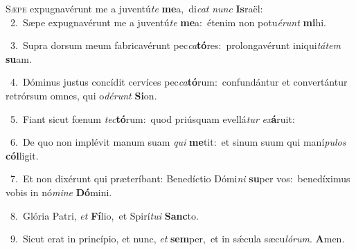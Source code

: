 \lettrine{\initial\textcolor{\initialcolor}{S}}{æpe} expugnavérunt me a juventú\textit{te} \textbf{me}\-a,~\star di\textit{cat} \textit{nunc} \textbf{Is}\-raël:\\
{\numbfont\textcolor{\numbcolor}{~2.}}~Sæpe expugnavérunt me a juventú\textit{te} \textbf{me}\-a:~\star étenim non potu\-\textit{é}\-\textit{runt} \textbf{mi}\-hi.\par
{\numbfont\textcolor{\numbcolor}{~3.}}~Supra dorsum meum fabricavérunt pec\-\textit{ca}\-\textbf{tó}res:~\star prolongavérunt iniqui\-\textit{tá}\-\textit{tem} \textbf{su}\-am.\par
{\numbfont\textcolor{\numbcolor}{~4.}}~Dóminus justus concídit cervíces pec\-\textit{ca}\-\textbf{tó}rum:~\star confundántur et convertántur retrórsum omnes, qui o\-\textit{dé}\-\textit{runt} \textbf{Si}\-on.\par
{\numbfont\textcolor{\numbcolor}{~5.}}~Fiant sicut fœnum \textit{tec}\-\textbf{tó}rum:~\star quod priúsquam evellá\textit{tur} \textit{ex}\-\textbf{á}ruit:\par
{\numbfont\textcolor{\numbcolor}{~6.}}~De quo non implévit manum suam \textit{qui} \textbf{me}\-tit:~\star et sinum suum qui maní\-\textit{pu}\-\textit{los} \textbf{cól}\-ligit.\par
{\numbfont\textcolor{\numbcolor}{~7.}}~Et non dixérunt qui præteríbant: Benedíctio Dómi\textit{ni} \textbf{su}\-per vos:~\star benedíximus vobis in nó\-\textit{mi}\-\textit{ne} \textbf{Dó}\-mini.\par
{\numbfont\textcolor{\numbcolor}{~8.}}~Glória Patri, \textit{et} \textbf{Fí}\-lio,~\star et Spirí\-\textit{tu}\-\textit{i} \textbf{Sanc}\-to.\par
{\numbfont\textcolor{\numbcolor}{~9.}}~Sicut erat in princípio, et nunc, \textit{et} \textbf{sem}\-per,~\star et in sǽcula sæcu\-\textit{ló}\-\textit{rum}. \textbf{A}\-men.\par
